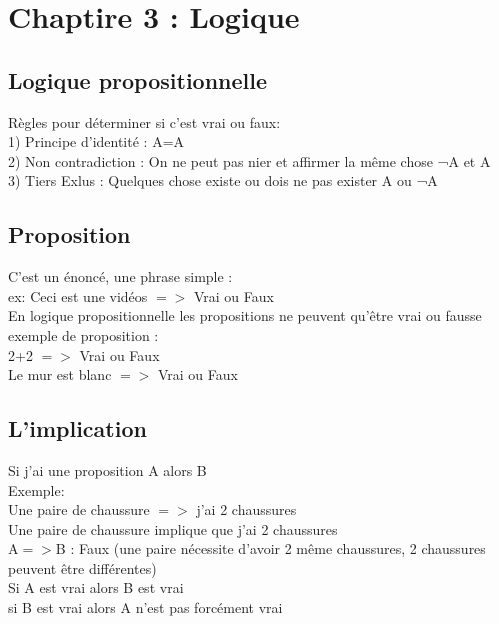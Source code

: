 \newpage

\section{Chaptire 3 : Logique}
\vspace{5mm} %

\subsection{Logique propositionnelle}
\vspace{5mm} %

Règles pour déterminer si c'est vrai ou faux: \\

1) Principe d'identité : A=A \\

2) Non contradiction : On ne peut pas nier et affirmer la même chose ¬A et A \\

3) Tiers Exlus : Quelques chose existe ou dois ne pas exister A ou ¬A \\


\subsection{Proposition}
\vspace{5mm} %

C'est un énoncé, une phrase simple : \\
ex: Ceci est une vidéos $=>$ Vrai ou Faux \\

En logique propositionnelle les propositions ne peuvent qu'être vrai ou fausse \\

exemple de proposition : \\
2+2 $=>$ Vrai ou Faux \\
Le mur est blanc $=>$ Vrai ou Faux \\

\subsection{L'implication}
\vspace{5mm} %

Si j'ai une proposition A alors B \\

Exemple: \\
Une paire de chaussure $=>$ j'ai 2 chaussures \\
Une paire de chaussure implique que j'ai 2 chaussures \\
A$=>$B : Faux (une paire nécessite d'avoir 2 même chaussures, 2 chaussures peuvent être différentes)\\
Si A est vrai alors B est vrai \\
si B est vrai alors A n'est pas forcément vrai \\

